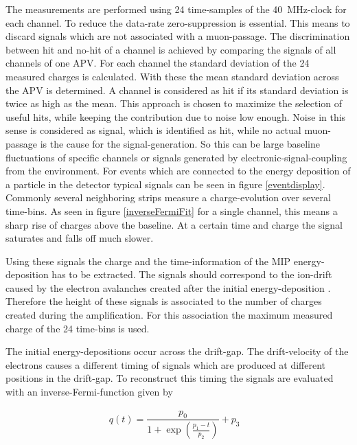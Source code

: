 \documentclass[
twoside,            %
BCOR1.4cm,          %
10pt,               %
headings=normal,    %
headsepline,        %
clearplainpage,		%
final,              %
div=14,
open=right,
bibliography=toc
]{scrreprt}
\begin{document}
The measurements are performed using 24 time-samples of the \SI{40}{MHz}-clock for each channel.
To reduce the data-rate zero-suppression is essential.
This means to discard signals which are not associated with a muon-passage.
The discrimination between hit and no-hit of a channel is achieved by comparing the signals of all channels of one APV.
For each channel the standard deviation of the 24 measured charges is calculated.
With these the mean standard deviation across the APV is determined.
A channel is considered as hit if its standard deviation is twice as high as the mean.
This approach is chosen to maximize the selection of useful hits, while keeping the contribution due to noise low enough.
Noise in this sense is considered as signal, which is identified as hit, while no actual muon-passage is the cause for the signal-generation.
So this can be large baseline fluctuations of specific channels or signals generated by electronic-signal-coupling from the environment.
For events which are connected to the energy deposition of a particle in the detector typical signals can be seen in figure \ref{eventdisplay}.
Commonly several neighboring strips measure a charge-evolution over several time-bins.
As seen in figure \ref{inverseFermiFit} for a single channel, this means a sharp rise of charges above the baseline.
At a certain time and charge the signal saturates and falls off much slower.

Using these signals the charge and the time-information of the MIP energy-deposition has to be extracted.
The signals should correspond to the ion-drift caused by the electron avalanches created after the initial energy-deposition \cite{klitznerThesis}.
Therefore the height of these signals is associated to the number of charges created during the amplification.
For this association the maximum measured charge of the 24 time-bins is used.

The initial energy-depositions occur across the drift-gap.
The drift-velocity of the electrons causes a different timing of signals which are produced at different positions in the drift-gap.
To reconstruct this timing the signals are evaluated with an inverse-Fermi-function given by

\begin{align}
	q(t) = \dfrac{p_{0}}{1 + \exp\left(\tfrac{p_{1} - t}{p_{2}}\right)} + p_{3} \;\;\;
\end{align}
\end{document}
